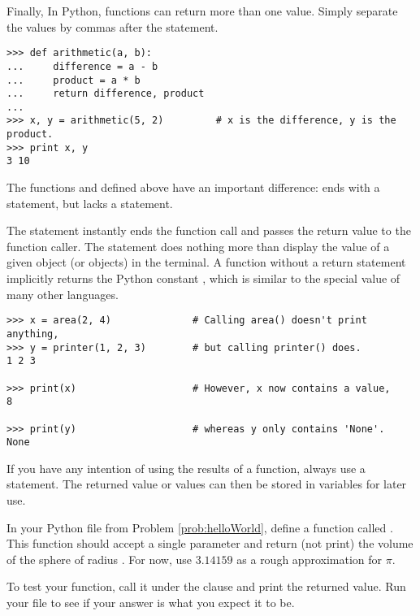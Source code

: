 Finally, In Python, functions can return more than one value.
Simply separate the values by commas after the  statement.

\begin{lstlisting}
>>> def arithmetic(a, b):
...     difference = a - b
...     product = a * b
...     return difference, product
...
>>> x, y = arithmetic(5, 2)         # x is the difference, y is the product.
>>> print x, y
3 10
\end{lstlisting}

\begin{info} %
The functions  and  defined above have an important difference:  ends with a  statement, but  lacks a  statement.

The  statement instantly ends the function call and passes the return value to the function caller.
The  statement does nothing more than display the value of a given object (or objects) in the terminal.
A function without a return statement implicitly returns the Python constant , which is similar to the  special value of many other languages.

\begin{lstlisting}
>>> x = area(2, 4)              # Calling area() doesn't print anything,
>>> y = printer(1, 2, 3)        # but calling printer() does.
1 2 3

>>> print(x)                    # However, x now contains a value,
8

>>> print(y)                    # whereas y only contains 'None'.
None
\end{lstlisting}

If you have any intention of using the results of a function, always use a  statement.
The returned value or values can then be stored in variables for later use.
\end{info}

\begin{problem} %
In your Python file from Problem \ref{prob:helloWorld}, define a function called .
This function should accept a single parameter  and return (not print) the volume of the sphere of radius .
For now, use $3.14159$ as a rough approximation for $\pi$.

To test your function, call it under the  clause and print the returned value.
Run your file to see if your answer is what you expect it to be.
\end{problem}

